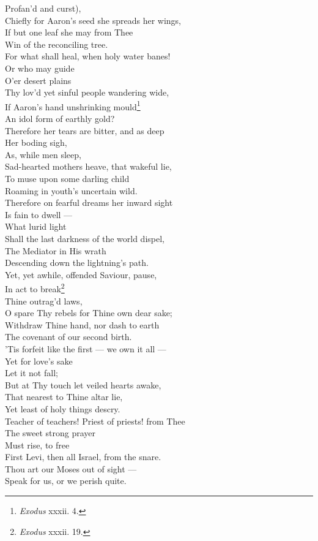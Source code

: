  Profan’d and curst), \\
 Chiefly for Aaron’s seed she spreads her wings, \\
 If but one leaf she may from Thee \\
 Win of the reconciling tree. \\
  For what shall heal, when holy water banes! \\
 Or who may guide \\
 O’er desert plains \\
 Thy lov’d yet sinful people wandering wide, \\
 If Aaron’s hand unshrinking mould\footnote{\emph{Exodus} xxxii. 4.} \\
 An idol form of earthly gold? \\
  Therefore her tears are bitter, and as deep \\
 Her boding sigh, \\
 As, while men sleep, \\
 Sad-hearted mothers heave, that wakeful lie, \\
 To muse upon some darling child \\
 Roaming in youth’s uncertain wild. \\
  Therefore on fearful dreams her inward sight \\
 Is fain to dwell — \\
 What lurid light \\
 Shall the last darkness of the world dispel, \\
 The Mediator in His wrath \\
 Descending down the lightning’s path. \\
  Yet, yet awhile, offended Saviour, pause, \\
 In act to break\footnote{\emph{Exodus} xxxii. 19.} \\
 Thine outrag’d laws, \\
 O spare Thy rebels for Thine own dear sake; \\
 Withdraw Thine hand, nor dash to earth \\
 The covenant of our second birth. \\
  ’Tis forfeit like the first — we own it all — \\
 Yet for love’s sake \\
 Let it not fall; \\
 But at Thy touch let veiled hearts awake, \\
 That nearest to Thine altar lie, \\
 Yet least of holy things descry. \\
  Teacher of teachers! Priest of priests! from Thee \\
 The sweet strong prayer \\
 Must rise, to free \\
 First Levi, then all Israel, from the snare. \\
 Thou art our Moses out of sight — \\
 Speak for us, or we perish quite.\\

